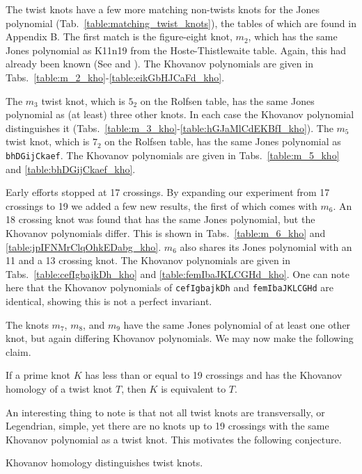     The twist knots have a few more matching non-twists knots for the
    Jones polynomial (Tab.~\ref{table:matching_twist_knots}), the tables of
    which are found in Appendix B. The first match is the
    figure-eight knot, $m_{2}$, which has the same Jones polynomial as
    K11n19 from the Hoste-Thistlewaite table.
    Again, this had already been known
    (See \cite{KatlasFigureEight} and \cite{KatlasK11n19}).
    The Khovanov polynomials are
    given in Tabs.~\ref{table:m_2_kho}-\ref{table:eikGbHJCaFd_kho}.
    \par\hfill\par
    The $m_{3}$ twist knot, which is $5_{2}$ on the Rolfsen table,
    has the same Jones polynomial as (at least) three other knots. In each
    case the Khovanov polynomial distinguishes it
    (Tabs.~\ref{table:m_3_kho}-\ref{table:hGJaMlCdEKBfI_kho}).
    The $m_{5}$ twist knot, which is $7_{2}$ on the Rolfsen table, has the
    same Jones polynomial as \texttt{bhDGijCkaef}. The Khovanov polynomials
    are given in Tabs.~\ref{table:m_5_kho} and \ref{table:bhDGijCkaef_kho}.
    \par\hfill\par
    Early efforts stopped at 17 crossings. By
    expanding our experiment from 17 crossings to 19 we added a few new
    results, the first of which comes with
    $m_{6}$. An 18 crossing knot was found
    that has the same Jones polynomial, but the Khovanov polynomials
    differ. This is shown in
    Tabs.~\ref{table:m_6_kho} and \ref{table:jpIFNMrClqOhkEDabg_kho}.
    $m_{6}$ also shares its Jones polynomial with an 11 and a 13 crossing
    knot. The Khovanov polynomials are given in
    Tabs.~\ref{table:cefIgbajkDh_kho} and
    \ref{table:femIbaJKLCGHd_kho}.
    One can note here that the Khovanov polynomials of \texttt{cefIgbajkDh} and
    \texttt{femIbaJKLCGHd} are identical, showing this is not a perfect
    invariant.
    \par\hfill\par
    The knots $m_{7}$, $m_{8}$, and $m_{9}$ have the same Jones polynomial
    of at least one other knot, but again differing Khovanov polynomials.
    We may now make the following claim.
    \begin{theorem}
        If a prime knot $K$ has less than or equal to 19 crossings and has
        the Khovanov homology of a twist knot $T$,
        then $K$ is equivalent to $T$.
    \end{theorem}
    An interesting thing to note is that not all twist knots are
    transversally, or Legendrian, simple, yet there are no knots up to
    19 crossings with the same Khovanov polynomial as a twist knot. This
    motivates the following conjecture.
    \begin{conjecture}
        Khovanov homology distinguishes twist knots.
    \end{conjecture}
